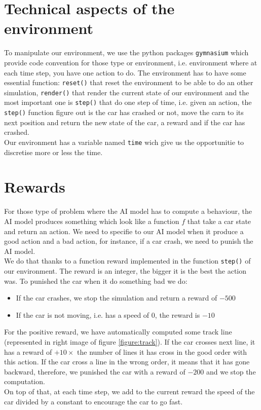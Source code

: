 \documentclass[11pt,a4paper]{article}
\newcounter{fig}
\newcommand{\mlist}[1]{\begin{itemize}[noitemsep,topsep=0pt]#1\end{itemize}}
\begin{document}
		\section{Technical aspects of the environment}
To manipulate our environment, we use the python packages \texttt{gymnasium} which provide code convention for those type or environment, i.e. environment where at each time step, you have one action to do. The environment has to have some essential function: \texttt{reset()} that reset the environment to be able to do an other simulation, \texttt{render()} that render the current state of our environment and the most important one is \texttt{step()} that do one step of time, i.e. given an action, the \texttt{step()} function figure out is the car has crashed or not, move the carn to its next position and return the new state of the car, a reward and if the car has crashed.\\
Our environment has a variable named \texttt{time} wich give us the opportunitie to discretise more or less the time.
		
		\section{Rewards}
For those type of problem where the AI model has to compute a behaviour, the AI model produces something which look like a function $f$ that take a car state and return an action. We need to specifie to our AI model when it produce a good action and a bad action, for instance, if a car crash, we need to punish the AI model.\\
We do that thanks to a function reward implemented in the function \texttt{step()} of our environment. The reward is an integer, the bigger it is the best the action was. To punished the car when it do something bad we do:
\mlist{
\item If the car crashes, we stop the simulation and return a reward of $-500$
\item If the car is not moving, i.e. has a speed of $0$, the reward is $-10$
}
For the positive reward, we have automatically computed some track line (represented in right image of figure \ref{figure:track}). If the car crosses next line, it has a reward of $+10\times$ the number of lines it has cross in the good order with this action. If the car cross a line in the wrong order, it means that it has gone backward, therefore, we punished the car with a reward of $-200$ and we stop the computation.\\
On top of that, at each time step, we add to the current reward the speed of the car divided by a constant to encourage the car to go fast.
\end{document}
